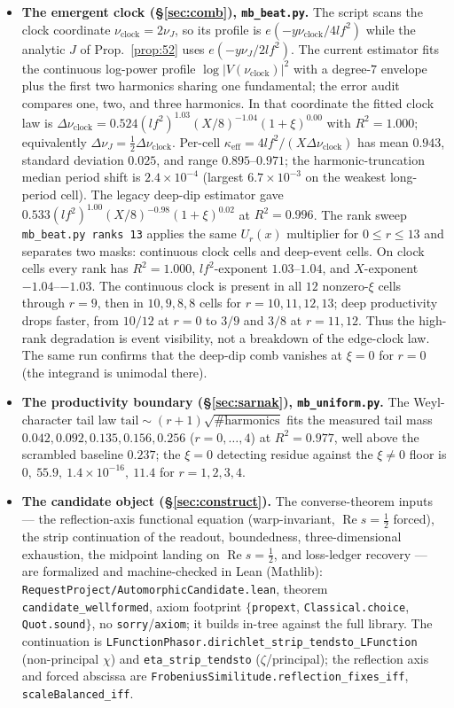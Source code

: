 \documentclass[11pt]{article}
\theoremstyle{definition}
\renewcommand{\Re}{\operatorname{Re}}
\begin{document}
\begin{itemize}
\item \textbf{The emergent clock (\S\ref{sec:comb}), \texttt{mb\_beat.py}.} The script scans the clock
coordinate $\nu_{\mathrm{clock}}=2\nu_J$, so its profile is
$e(-y\nu_{\mathrm{clock}}/4lf^2)$ while the analytic $J$ of Prop.~\ref{prop:52} uses
$e(-y\nu_J/2lf^2)$. The current estimator fits the continuous log-power profile
$\log|V(\nu_{\mathrm{clock}})|^2$ with a degree-$7$ envelope plus the first two harmonics sharing one
fundamental; the error audit compares one, two, and three harmonics. In that coordinate the fitted
clock law is
$\Delta\nu_{\mathrm{clock}}=0.524(lf^2)^{1.03}(X/8)^{-1.04}(1+\xi)^{0.00}$ with $R^2=1.000$; equivalently
$\Delta\nu_J=\tfrac12\Delta\nu_{\mathrm{clock}}$. Per-cell
$\kappa_{\mathrm{eff}}=4lf^2/(X\Delta\nu_{\mathrm{clock}})$ has mean $0.943$, standard deviation $0.025$,
and range $0.895$--$0.971$; the harmonic-truncation median period shift is $2.4\times10^{-4}$ (largest
$6.7\times10^{-3}$ on the weakest long-period cell). The legacy deep-dip estimator gave
$0.533(lf^2)^{1.00}(X/8)^{-0.98}(1+\xi)^{0.02}$ at $R^2=0.996$. The rank sweep
\texttt{mb\_beat.py ranks 13} applies the same $U_r(x)$ multiplier for $0\le r\le13$ and separates two masks:
continuous clock cells and deep-event cells. On clock cells every rank has $R^2=1.000$, $lf^2$-exponent
$1.03$--$1.04$, and $X$-exponent $-1.04$--$-1.03$. The continuous clock is present in all $12$ nonzero-$\xi$
cells through $r=9$, then in $10,9,8,8$ cells for $r=10,11,12,13$; deep productivity drops faster, from
$10/12$ at $r=0$ to $3/9$ and $3/8$ at $r=11,12$. Thus the high-rank degradation is event visibility, not a
breakdown of the edge-clock law. The same run confirms that the deep-dip comb vanishes at $\xi=0$ for $r=0$
(the integrand is unimodal there).

\item \textbf{The productivity boundary (\S\ref{sec:sarnak}), \texttt{mb\_uniform.py}.} The
Weyl-character tail law $\text{tail}\sim(r{+}1)\sqrt{\#\text{harmonics}}$ fits the measured tail mass
$0.042,0.092,0.135,0.156,0.256$ ($r=0,\dots,4$) at $R^2=0.977$, well above the scrambled baseline
$0.237$; the $\xi=0$ detecting residue against the $\xi\neq0$ floor is
$0,\ 55.9,\ 1.4\times10^{-16},\ 11.4$ for $r=1,2,3,4$.

\item \textbf{The candidate object (\S\ref{sec:construct}).} The converse-theorem inputs --- the
reflection-axis functional equation (warp-invariant, $\Re s=\tfrac12$ forced), the strip continuation
of the readout, boundedness, three-dimensional exhaustion, the midpoint landing on $\Re s=\tfrac12$,
and loss-ledger recovery --- are formalized and machine-checked in Lean (Mathlib):
\texttt{RequestProject/AutomorphicCandidate.lean}, theorem \texttt{candidate\_wellformed}, axiom
footprint $\{$\texttt{propext}, \texttt{Classical.choice}, \texttt{Quot.sound}$\}$, no
\texttt{sorry}/\texttt{axiom}; it builds in-tree against the full library. The continuation is
\texttt{LFunctionPhasor.dirichlet\_strip\_tendsto\_LFunction} (non-principal $\chi$) and
\texttt{eta\_strip\_tendsto} ($\zeta$/principal); the reflection axis and forced abscissa are
\texttt{FrobeniusSimilitude.reflection\_fixes\_iff}, \texttt{scaleBalanced\_iff}.


\end{itemize}
\end{document}
